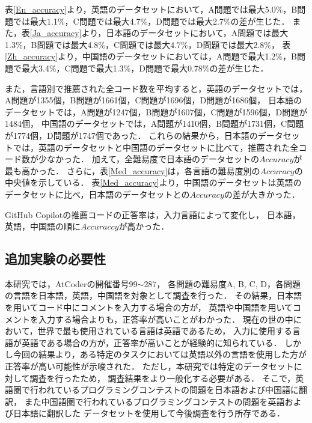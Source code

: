   表\ref{En_accuracy}より，英語のデータセットにおいて，A問題では最大5.0\%，B問題では最大1.1\%，C問題では最大4.7\%，D問題では最大2.7\%の差が生じた．
  また，表\ref{Ja_accuracy}より，日本語のデータセットにおいて，A問題では最大1.3\%，B問題では最大4.8\%，C問題では最大4.7\%，D問題では最大2.8\%，
  表\ref{Zh_accuracy}より，中国語のデータセットにおいては，A問題で最大1.2\%，B問題で最大3.4\%，C問題で最大1.3\%，D問題で最大0.78\%の差が生じた．

  また，言語別で推薦された全コード数を平均すると，英語のデータセットでは，A問題が1355個，B問題が1661個，C問題が1696個，D問題が1686個，
  日本語のデータセットでは，A問題が1247個，B問題が1607個，C問題が1596個，D問題が1484個，
  中国語のデータセットでは，A問題が1410個，B問題が1731個，C問題が1774個，D問題が1747個であった．
  これらの結果から，日本語のデータセットでは，英語のデータセットと中国語のデータセットに比べて，推薦された全コード数が少なかった．
  加えて，全難易度で日本語のデータセットの$Accuracy$が最も高かった．
  さらに，表\ref{Med_accuracy}は，各言語の難易度別の$Accuracy$の中央値を示している．   
  表\ref{Med_accuracy}より，中国語のデータセットは英語のデータセットに比べ，日本語のデータセットとの$Accuracy$の差が大きかった．

  \begin{screen}
    GitHub Copilotの推薦コードの正答率は，入力言語によって変化し，
    日本語，英語，中国語の順に$Accuraccy$が高かった．
  \end{screen}

\vspace{-1zh}
  \subsection{追加実験の必要性\label{future_work}}
    本研究では，AtCoder\cite{AtCoder}の開催番号99${\sim}$287，
    各問題の難易度A, B, C, D，各問題の言語を日本語，英語，中国語を対象として調査を行った．
    その結果，日本語を用いてコード中にコメントを入力する場合の方が，
    英語や中国語を用いてコメントを入力する場合よりも，正答率が高いことがわかった．
    現在の世の中において，世界で最も使用されている言語は英語である\cite{Ethnologue}ため，
    入力に使用する言語が英語である場合の方が，正答率が高いことが経験的に知られている．
    しかし今回の結果より，ある特定のタスクにおいては英語以外の言語を使用した方が正答率が高い可能性が示唆された．
    ただし，本研究では特定のデータセットに対して調査を行ったため，
    調査結果をより一般化する必要がある．
    そこで，英語圏で行われているプログラミングコンテストの問題を日本語および中国語に翻訳，
    また中国語圏で行われているプログラミングコンテストの問題を英語および日本語に翻訳した
    データセットを使用して今後調査を行う所存である．

